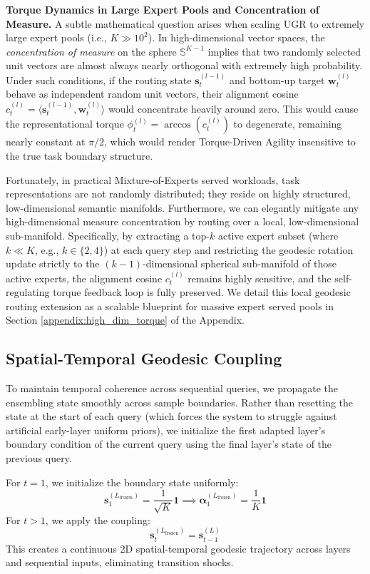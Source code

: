 \textbf{Torque Dynamics in Large Expert Pools and Concentration of Measure.} A subtle mathematical question arises when scaling UGR to extremely large expert pools (i.e., $K \gg 10^2$). In high-dimensional vector spaces, the \emph{concentration of measure} on the sphere $\mathbb{S}^{K-1}$ implies that two randomly selected unit vectors are almost always nearly orthogonal with extremely high probability. Under such conditions, if the routing state $\mathbf{s}_t^{(l-1)}$ and bottom-up target $\mathbf{w}_t^{(l)}$ behave as independent random unit vectors, their alignment cosine $c_t^{(l)} = \langle \mathbf{s}_t^{(l-1)}, \mathbf{w}_t^{(l)} \rangle$ would concentrate heavily around zero. This would cause the representational torque $\phi_t^{(l)} = \arccos(c_t^{(l)})$ to degenerate, remaining nearly constant at $\pi/2$, which would render Torque-Driven Agility insensitive to the true task boundary structure.

Fortunately, in practical Mixture-of-Experts served workloads, task representations are not randomly distributed; they reside on highly structured, low-dimensional semantic manifolds. Furthermore, we can elegantly mitigate any high-dimensional measure concentration by routing over a local, low-dimensional sub-manifold. Specifically, by extracting a top-$k$ active expert subset (where $k \ll K$, e.g., $k \in \{2, 4\}$) at each query step and restricting the geodesic rotation update strictly to the $(k-1)$-dimensional spherical sub-manifold of those active experts, the alignment cosine $c_t^{(l)}$ remains highly sensitive, and the self-regulating torque feedback loop is fully preserved. We detail this local geodesic routing extension as a scalable blueprint for massive expert served pools in Section \ref{appendix:high_dim_torque} of the Appendix.

\subsection{Spatial-Temporal Geodesic Coupling}
To maintain temporal coherence across sequential queries, we propagate the ensembling state smoothly across sample boundaries. Rather than resetting the state at the start of each query (which forces the system to struggle against artificial early-layer uniform priors), we initialize the first adapted layer's boundary condition of the current query using the final layer's state of the previous query.

For $t = 1$, we initialize the boundary state uniformly:
\begin{equation}
\mathbf{s}_1^{(L_{\text{frozen}})} = \frac{1}{\sqrt{K}} \mathbf{1} \implies \boldsymbol{\alpha}_1^{(L_{\text{frozen}})} = \frac{1}{K} \mathbf{1}
\end{equation}
For $t > 1$, we apply the coupling:
\begin{equation}
\mathbf{s}_t^{(L_{\text{frozen}})} = \mathbf{s}_{t-1}^{(L)}
\end{equation}
This creates a continuous 2D spatial-temporal geodesic trajectory across layers and sequential inputs, eliminating transition shocks.

